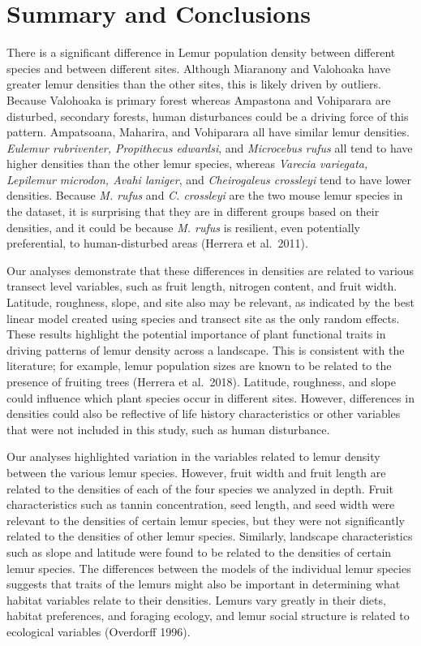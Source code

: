 \documentclass[
  12pt,
]{article}
\begin{document}
\hypertarget{summary-and-conclusions}{%
\section{Summary and Conclusions}\label{summary-and-conclusions}}

There is a significant difference in Lemur population density between
different species and between different sites. Although Miaranony and
Valohoaka have greater lemur densities than the other sites, this is
likely driven by outliers. Because Valohoaka is primary forest whereas
Ampastona and Vohiparara are disturbed, secondary forests, human
disturbances could be a driving force of this pattern. Ampatsoana,
Maharira, and Vohiparara all have similar lemur densities. \emph{Eulemur
rubriventer, Propithecus edwardsi}, and \emph{Microcebus rufus} all tend
to have higher densities than the other lemur species, whereas
\emph{Varecia variegata, Lepilemur microdon, Avahi laniger}, and
\emph{Cheirogaleus crossleyi} tend to have lower densities. Because
\emph{M. rufus} and \emph{C. crossleyi} are the two mouse lemur species
in the dataset, it is surprising that they are in different groups based
on their densities, and it could be because \emph{M. rufus} is
resilient, even potentially preferential, to human-disturbed areas
(Herrera et al.~2011).

Our analyses demonstrate that these differences in densities are related
to various transect level variables, such as fruit length, nitrogen
content, and fruit width. Latitude, roughness, slope, and site also may
be relevant, as indicated by the best linear model created using species
and transect site as the only random effects. These results highlight
the potential importance of plant functional traits in driving patterns
of lemur density across a landscape. This is consistent with the
literature; for example, lemur population sizes are known to be related
to the presence of fruiting trees (Herrera et al.~2018). Latitude,
roughness, and slope could influence which plant species occur in
different sites. However, differences in densities could also be
reflective of life history characteristics or other variables that were
not included in this study, such as human disturbance.

Our analyses highlighted variation in the variables related to lemur
density between the various lemur species. However, fruit width and
fruit length are related to the densities of each of the four species we
analyzed in depth. Fruit characteristics such as tannin concentration,
seed length, and seed width were relevant to the densities of certain
lemur species, but they were not significantly related to the densities
of other lemur species. Similarly, landscape characteristics such as
slope and latitude were found to be related to the densities of certain
lemur species. The differences between the models of the individual
lemur species suggests that traits of the lemurs might also be important
in determining what habitat variables relate to their densities. Lemurs
vary greatly in their diets, habitat preferences, and foraging ecology,
and lemur social structure is related to ecological variables (Overdorff
1996).
\end{document}
